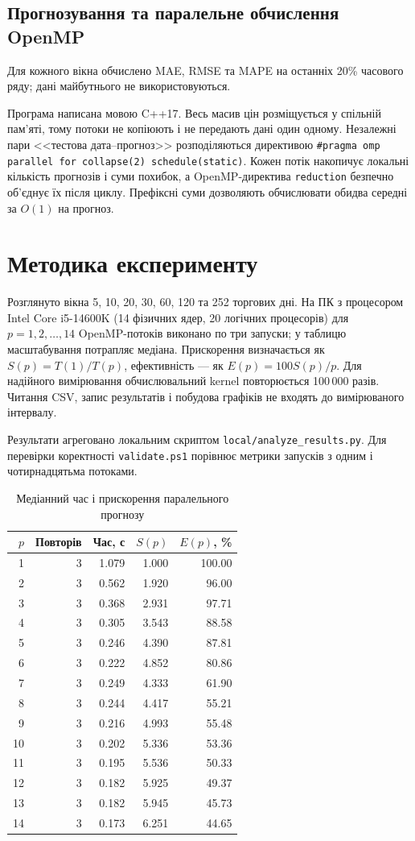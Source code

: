 \documentclass[14pt]{extarticle}
\begin{document}
\subsection{Прогнозування та паралельне обчислення OpenMP}
Для кожного вікна обчислено MAE, RMSE та MAPE на останніх 20\% часового ряду; дані майбутнього не використовуються.

Програма написана мовою C++17. Весь масив цін розміщується у спільній пам'яті, тому потоки не копіюють і не передають дані один одному. Незалежні пари <<тестова дата--прогноз>> розподіляються директивою \texttt{\#pragma omp parallel for collapse(2) schedule(static)}. Кожен потік накопичує локальні кількість прогнозів і суми похибок, а OpenMP-директива \texttt{reduction} безпечно об'єднує їх після циклу. Префіксні суми дозволяють обчислювати обидва середні за $O(1)$ на прогноз.

\section{Методика експерименту}
Розглянуто вікна 5, 10, 20, 30, 60, 120 та 252 торгових дні. На ПК з процесором Intel Core i5-14600K (14 фізичних ядер, 20 логічних процесорів) для $p=1,2,\ldots,14$ OpenMP-потоків виконано по три запуски; у таблицю масштабування потрапляє медіана. Прискорення визначається як $S(p)=T(1)/T(p)$, ефективність --- як $E(p)=100S(p)/p$. Для надійного вимірювання обчислювальний kernel повторюється 100\,000 разів. Читання CSV, запис результатів і побудова графіків не входять до вимірюваного інтервалу.

Результати агреговано локальним скриптом \texttt{local/analyze\_results.py}. Для перевірки коректності \texttt{validate.ps1} порівнює метрики запусків з одним і чотирнадцятьма потоками.

\begin{table}[htbp]
\caption{Медіанний час і прискорення паралельного прогнозу}
\centering
\begin{tabular}{rrrrr}
\toprule
$p$ & Повторів & Час, с & $S(p)$ & $E(p)$, \% \\
\midrule
1 & 3 & 1.079 & 1.000 & 100.00 \\
2 & 3 & 0.562 & 1.920 & 96.00 \\
3 & 3 & 0.368 & 2.931 & 97.71 \\
4 & 3 & 0.305 & 3.543 & 88.58 \\
5 & 3 & 0.246 & 4.390 & 87.81 \\
6 & 3 & 0.222 & 4.852 & 80.86 \\
7 & 3 & 0.249 & 4.333 & 61.90 \\
8 & 3 & 0.244 & 4.417 & 55.21 \\
9 & 3 & 0.216 & 4.993 & 55.48 \\
10 & 3 & 0.202 & 5.336 & 53.36 \\
11 & 3 & 0.195 & 5.536 & 50.33 \\
12 & 3 & 0.182 & 5.925 & 49.37 \\
13 & 3 & 0.182 & 5.945 & 45.73 \\
14 & 3 & 0.173 & 6.251 & 44.65 \\
\bottomrule
\end{tabular}
\end{table}
\end{document}
